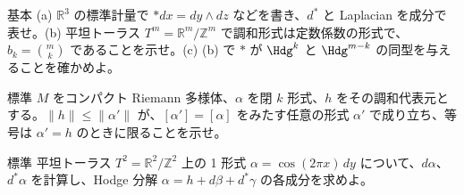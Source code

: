 \begin{prob}{基本}\label{p:starflat}
(a) $\mathbb R^3$ の標準計量で $\ast dx=dy\wedge dz$ などを書き、$d^*$ と Laplacian を成分で表せ。(b) 平坦トーラス $T^m=\mathbb R^m/\mathbb Z^m$ で調和形式は定数係数の形式で、$b_k=\binom mk$ であることを示せ。(c) (b) で $\ast$ が $\Hdg^k$ と $\Hdg^{m-k}$ の同型を与えることを確かめよ。
\end{prob}
\begin{prob}{標準}\label{p:minnorm}
$M$ をコンパクト Riemann 多様体、$\alpha$ を閉 $k$ 形式、$h$ をその調和代表元とする。$\|h\|\le\|\alpha'\|$ が、$[\alpha']=[\alpha]$ をみたす任意の形式 $\alpha'$ で成り立ち、等号は $\alpha'=h$ のときに限ることを示せ。
\end{prob}
\begin{prob}{標準}\label{p:hodgedecomp}
平坦トーラス $T^2=\mathbb R^2/\mathbb Z^2$ 上の 1 形式 $\alpha=\cos(2\pi x)\,dy$ について、$d\alpha$、$d^*\alpha$ を計算し、Hodge 分解 $\alpha=h+d\beta+d^*\gamma$ の各成分を求めよ。
\end{prob}

